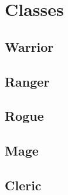 

\chapter{Classes}
\section{Warrior}
\section{Ranger}
\section{Rogue}
\section{Mage}
\section{Cleric}

